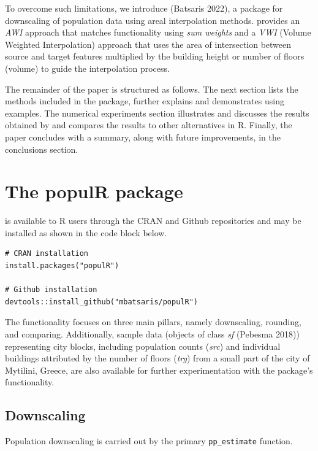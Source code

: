 To overcome such limitations, we introduce  (Batsaris 2022), a package for downscaling of population data using areal interpolation methods.  provides an \emph{AWI} approach that matches  functionality using \emph{sum weights} and a \emph{VWI} (Volume Weighted Interpolation) approach that uses the area of intersection between source and target features multiplied by the building height or number of floors (volume) to guide the interpolation process.

The remainder of the paper is structured as follows. The next section lists the methods included in the  package, further explains and demonstrates using examples. The numerical experiments section illustrates and discusses the results obtained by  and compares the results to other alternatives in R. Finally, the paper concludes with a summary, along with future improvements, in the conclusions section.

\hypertarget{the-populr-package}{%
\section{The populR package}\label{the-populr-package}}

 is available to R users through the CRAN and Github repositories and may be installed as shown in the code block below.

\begin{verbatim}
# CRAN installation
install.packages("populR")

# Github installation
devtools::install_github("mbatsaris/populR")
\end{verbatim}

The  functionality focuses on three main pillars, namely downscaling, rounding, and comparing. Additionally, sample data (objects of class \emph{sf} (Pebesma 2018)) representing city blocks, including population counts (\emph{src}) and individual buildings attributed by the number of floors (\emph{trg}) from a small part of the city of Mytilini, Greece, are also available for further experimentation with the package's functionality.

\hypertarget{downscaling}{%
\subsection{Downscaling}\label{downscaling}}

Population downscaling is carried out by the primary \texttt{pp\_estimate} function.

